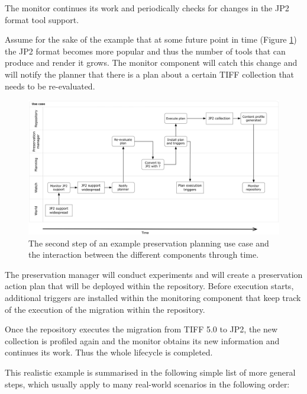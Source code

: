 The monitor continues its work and periodically checks for changes in the JP2 format tool support.

Assume for the sake of the example that at some future point in time (Figure \ref{fig:swimlane_step2}) the JP2 format becomes more popular and thus the number of tools that can produce and render it grows. The monitor component will catch this change and will notify the planner that there is a plan about a certain TIFF collection that needs to be re-evaluated.

\begin{figure}[th]
\begin{center}
\includegraphics[width=6in]{figures/related/swimlane_step2.png}
\caption{The second step of an example preservation planning use case and the interaction between the different components through time.}
\label{fig:swimlane_step2}
\end{center}
\end{figure}

The preservation manager will conduct experiments and will create a preservation action plan that will be deployed within the repository. Before execution starts, additional triggers are installed within the monitoring component that keep track of the execution of the migration within the repository.

Once the repository executes the migration from TIFF 5.0 to JP2, the new collection is profiled again and the monitor obtains its new information and continues its work. Thus the whole lifecycle is completed.

This realistic example is summarised in the following simple list of more general steps, which usually apply to many real-world scenarios in the following order:

